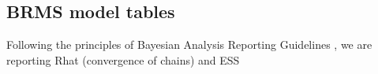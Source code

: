 \documentclass[12pt,letterpaper]{article}
\begin{document}










\newpage
\subsection{BRMS model tables}
\label{BRMS_model_tables}
Following the principles of Bayesian Analysis Reporting Guidelines \citep{kruschke2021bayesian}, we are reporting Rhat (convergence of chains) and ESS
\end{document}
